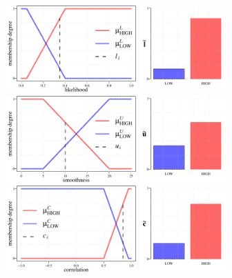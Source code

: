 \begin{figure}%
	\centering
	\includegraphics[height=9em]{L_fuzzification_1_embedded}
	\includegraphics[height=9em]{L_fuzzification_2_embedded} \\[2ex]
	\includegraphics[height=9em]{U_fuzzification_1_embedded}
	\includegraphics[height=9em]{U_fuzzification_2_embedded} \\[2ex]
	\includegraphics[height=9em]{C_fuzzification_1_embedded}
	\includegraphics[height=9em]{C_fuzzification_2_embedded} \\

\end{figure}
